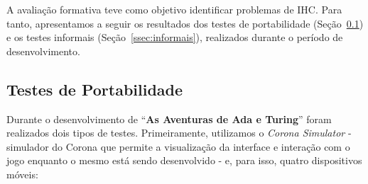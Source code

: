 A avaliação formativa teve como objetivo identificar problemas de \acrshort{IHC}. Para tanto, apresentamos a seguir os resultados dos testes de portabilidade (Seção~\ref{ssec:testes_portabilidade}) e os testes informais (Seção~\ref{ssec:informais}), realizados durante o período de desenvolvimento.

\subsection{Testes de Portabilidade} \label{ssec:testes_portabilidade}

Durante o desenvolvimento de “\textbf{As Aventuras de Ada e Turing}” foram realizados dois tipos de testes. Primeiramente, utilizamos o \textit{Corona Simulator} - simulador do Corona que permite a visualização da interface e interação com o jogo enquanto o mesmo está sendo desenvolvido - e, para isso, quatro dispositivos móveis:

